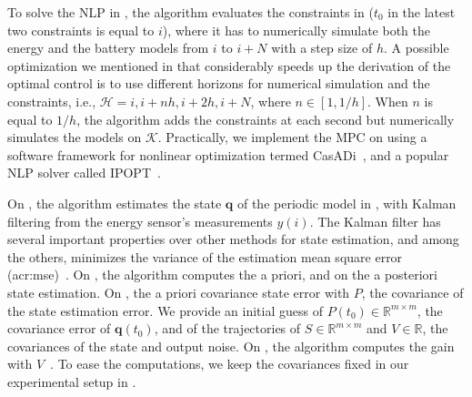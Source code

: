 To solve the NLP in , the algorithm evaluates the constraints in  ($t_0$ in the latest two constraints is equal to $i$), where it has to numerically simulate both the energy and the battery models from $i$ to $i+N$ with a step size of $h$. A possible optimization we mentioned in  that considerably speeds up the derivation of the optimal control is to use different horizons for numerical simulation and the constraints, i.e., $\mathcal{H}={i,i+nh,i+2h,i+N}$, where $n\in[1,1/h]$. When $n$ is equal to $1/h$, the algorithm adds the constraints at each second but numerically simulates the models on $\mathcal{K}$. 
Practically, we implement the MPC on  using a software framework for nonlinear optimization termed CasADi~\citep{andersson2012casadi,andersson2012bcasadi,andersson2019casadi}, and a popular NLP solver called IPOPT~\citep{wachter2006implementation}.

On , the algorithm estimates the state $\mathbf{q}$ of the periodic model in , with Kalman filtering from the energy sensor's measurements $y(i)$. The Kalman filter has several important properties over other methods for state estimation, and among the others, minimizes the variance of the estimation mean square error (\Gls{acr:mse})~\citep{kalman1960new,simon2006optimal,jwo2007practical}. On , the algorithm computes the a priori, and on  the a posteriori state estimation. On , the a priori covariance state error with $P$, the covariance of the state estimation error. We provide an initial guess of $P(t_0)\in\mathbb{R}^{m\times m}$, the covariance error of $\mathbf{q}(t_0)$, and of the trajectories of $S\in\mathbb{R}^{m\times m}$ and $V\in\mathbb{R}$, the covariances of the state and output noise. On , the algorithm computes the gain with $V$~\citep{simon2006optimal}. To ease the computations, we keep the covariances fixed in our experimental setup in .

